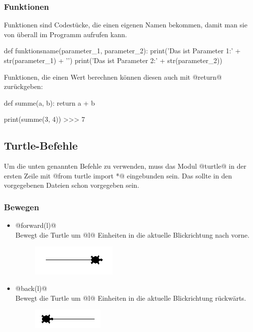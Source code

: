     \subsubsection*{Funktionen} 
    Funktionen sind Codestücke, die einen eigenen Namen bekommen, damit man sie von überall im Programm aufrufen kann. 

    \begin{code}
def funktionsname(parameter_1, parameter_2):
    print('Das ist Parameter 1:' + str(parameter_1) + '\n')
    print('Das ist Parameter 2:' + str(parameter_2))
    \end{code}

    Funktionen, die einen Wert berechnen können diesen auch mit @return@ zurückgeben:
    \begin{code}
def summe(a, b):
    return a + b

print(summe(3, 4))
>>> 7
    \end{code}
        



    \subsection*{Turtle-Befehle}    
    Um die unten genannten Befehle zu verwenden, muss das Modul @turtle@ in der ersten Zeile mit @from turtle import *@ eingebunden sein. Das sollte in den vorgegebenen Dateien schon vorgegeben sein.
    \subsubsection*{Bewegen}
    \begin{itemize}
        \item 
        @forward(l)@\\
        Bewegt die Turtle um @l@ Einheiten in die aktuelle Blickrichtung nach vorne.
        \begin{figure}[H]
            \centering
            \includegraphics[scale = 0.8]{img/forward}
        \end{figure}
        
        \item 
        @back(l)@\\
        Bewegt die Turtle um @l@ Einheiten in die aktuelle Blickrichtung rückwärts.
        \begin{figure}[H]
            \centering
            \includegraphics[scale = 0.8]{img/back}
        \end{figure}
    \end{itemize}

